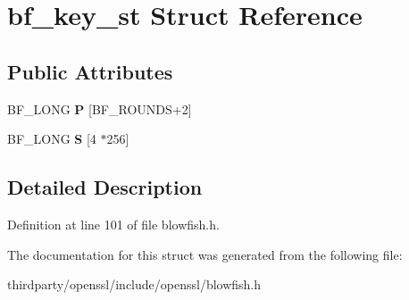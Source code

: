 \hypertarget{structbf__key__st}{}\section{bf\+\_\+key\+\_\+st Struct Reference}
\label{structbf__key__st}
\subsection*{Public Attributes}
\begin{DoxyCompactItemize}
\item 
\mbox{\label{structbf__key__st_ab3d902f934c73304feaa3989267dd49e}} 
B\+F\+\_\+\+L\+O\+NG {\bfseries P} \mbox{[}B\+F\+\_\+\+R\+O\+U\+N\+DS+2\mbox{]}
\item 
\mbox{\label{structbf__key__st_ace6847124ec6775c49ea44b13598f8a9}} 
B\+F\+\_\+\+L\+O\+NG {\bfseries S} \mbox{[}4 $\ast$256\mbox{]}
\end{DoxyCompactItemize}


\subsection{Detailed Description}


Definition at line 101 of file blowfish.\+h.



The documentation for this struct was generated from the following file\+:\begin{DoxyCompactItemize}
\item 
thirdparty/openssl/include/openssl/blowfish.\+h\end{DoxyCompactItemize}
